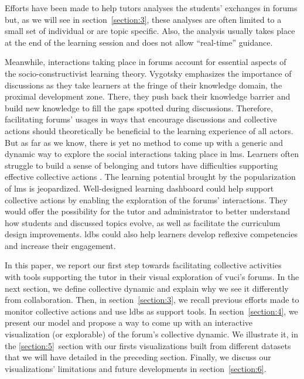 \documentclass[a4paper,twoside]{article}
\begin{document}
Efforts have been made to help tutors analyses the students' exchanges in forums but, as we will see in section~\ref{section:3}, these analyses are often limited to a small set of individual or are topic specific.  Also, the analysis usually takes place at the end of the learning session and does not allow ``real-time'' guidance.

Meanwhile, interactions taking place in forums account for essential aspects of the socio-constructivist learning theory.  Vygotsky emphasizes the importance of discussions as they take learners at the fringe of their knowledge domain, the proximal development zone.  There, they push back their knowledge barrier and build new knowledge to fill the gaps spotted during discussions.  Therefore, facilitating forums' usages in ways that encourage discussions and collective actions should theoretically be beneficial to the learning experience of all actors.  But as far as we know, there is yet no method to come up with a generic and dynamic way to explore the social interactions taking place in \gls{lms}.  Learners often struggle to build a sense of belonging \citep{Khalil2014} and tutors have difficulties supporting effective collective actions \citep{Zheng2015}.  The learning potential brought by the popularization of \gls{lms} is jeopardized.
Well-designed learning dashboard could help support collective actions by enabling the exploration of the forums' interactions.  They would offer the possibility for the tutor and administrator to better understand how students and discussed topics evolve, as well as facilitate the curriculum design improvements.  \glspl{ldb} could also help learners develop reflexive competencies and increase their engagement.


In this paper, we report our first step towards facilitating collective activities with tools supporting the tutor in their visual exploration of \gls{vuci}'s forums.
In the next section, we define collective dynamic and explain why we see it differently from collaboration.  Then, in section~\ref{section:3}, we recall previous efforts made to monitor collective actions and use \glspl{ldb} as support tools.  In section~\ref{section:4}, we present our model and propose a way to come up with an interactive visualization (or explorable) of the forum's collective dynamic.  We illustrate it, in the \ref{section:5}~section with our firsts visualizations built from different datasets that we will have detailed in the preceding section.  Finally, we discuss our visualizations' limitations and future developments in section~\ref{section:6}.
\end{document}
